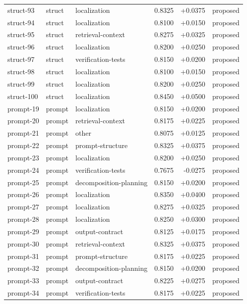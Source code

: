 \begin{center}
\begin{longtable}{llp{5.2cm}rrl}
struct-93 & struct & localization & 0.8325 & +0.0375 & proposed \\
struct-94 & struct & localization & 0.8100 & +0.0150 & proposed \\
struct-95 & struct & retrieval-context & 0.8275 & +0.0325 & proposed \\
struct-96 & struct & localization & 0.8200 & +0.0250 & proposed \\
struct-97 & struct & verification-tests & 0.8150 & +0.0200 & proposed \\
struct-98 & struct & localization & 0.8100 & +0.0150 & proposed \\
struct-99 & struct & localization & 0.8200 & +0.0250 & proposed \\
struct-100 & struct & localization & 0.8450 & +0.0500 & proposed \\
prompt-19 & prompt & localization & 0.8150 & +0.0200 & proposed \\
prompt-20 & prompt & retrieval-context & 0.8175 & +0.0225 & proposed \\
prompt-21 & prompt & other & 0.8075 & +0.0125 & proposed \\
prompt-22 & prompt & prompt-structure & 0.8325 & +0.0375 & proposed \\
prompt-23 & prompt & localization & 0.8200 & +0.0250 & proposed \\
prompt-24 & prompt & verification-tests & 0.7675 & -0.0275 & proposed \\
prompt-25 & prompt & decomposition-planning & 0.8150 & +0.0200 & proposed \\
prompt-26 & prompt & localization & 0.8350 & +0.0400 & proposed \\
prompt-27 & prompt & localization & 0.8275 & +0.0325 & proposed \\
prompt-28 & prompt & localization & 0.8250 & +0.0300 & proposed \\
prompt-29 & prompt & output-contract & 0.8125 & +0.0175 & proposed \\
prompt-30 & prompt & retrieval-context & 0.8325 & +0.0375 & proposed \\
prompt-31 & prompt & prompt-structure & 0.8175 & +0.0225 & proposed \\
prompt-32 & prompt & decomposition-planning & 0.8150 & +0.0200 & proposed \\
prompt-33 & prompt & output-contract & 0.8225 & +0.0275 & proposed \\
prompt-34 & prompt & verification-tests & 0.8175 & +0.0225 & proposed \\

\end{longtable}
\end{center}
